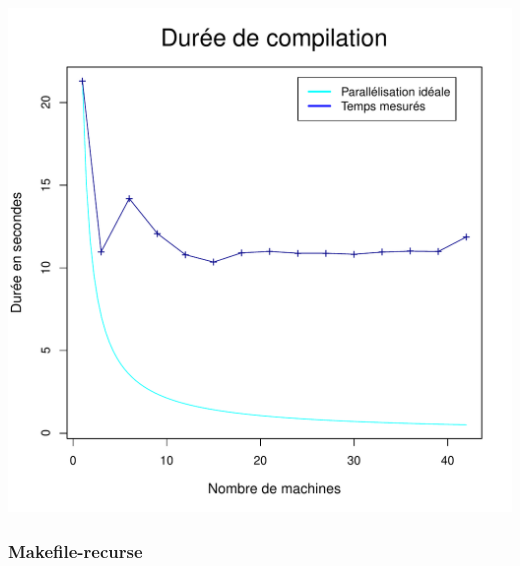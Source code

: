 \documentclass[a4paper, 11pt, titlepage]{article}
\begin{document}

\begin{center}
    \includegraphics[scale=0.55]{res/sujet_makefiles_blender_249_Makefile_nth8.pdf}
\end{center}


\subsubsection {Makefile-recurse}
\end{document}
